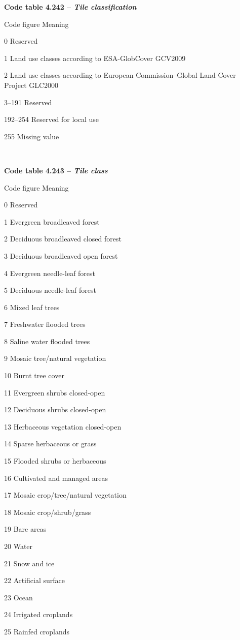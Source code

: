 \textbf{Code table 4.242 -- \emph{Tile classification}}

Code figure Meaning

0 Reserved

1 Land use classes according to ESA-GlobCover GCV2009

2 Land use classes according to European Commission--Global Land Cover Project GLC2000

3--191 Reserved

192--254 Reserved for local use

255 Missing value

\textbf{\\
}

\textbf{Code table 4.243 -- \emph{Tile class}}

Code figure Meaning

0 Reserved

1 Evergreen broadleaved forest

2 Deciduous broadleaved closed forest

3 Deciduous broadleaved open forest

4 Evergreen needle-leaf forest

5 Deciduous needle-leaf forest

6 Mixed leaf trees

7 Freshwater flooded trees

8 Saline water flooded trees

9 Mosaic tree/natural vegetation

10 Burnt tree cover

11 Evergreen shrubs closed-open

12 Deciduous shrubs closed-open

13 Herbaceous vegetation closed-open

14 Sparse herbaceous or grass

15 Flooded shrubs or herbaceous

16 Cultivated and managed areas

17 Mosaic crop/tree/natural vegetation

18 Mosaic crop/shrub/grass

19 Bare areas

20 Water

21 Snow and ice

22 Artificial surface

23 Ocean

24 Irrigated croplands

25 Rainfed croplands

